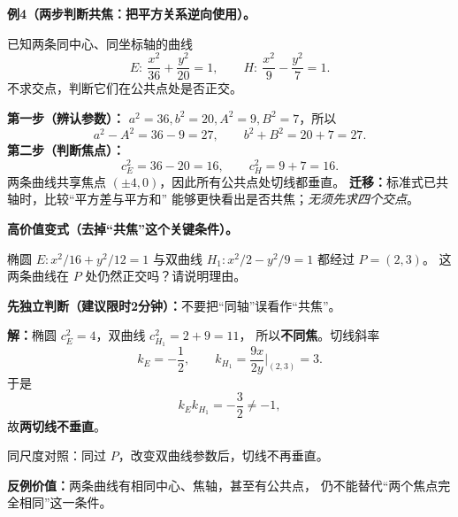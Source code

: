 \clearpage
\begin{examplebox}
\textbf{例4（两步判断共焦：把平方关系逆向使用）。}

已知两条同中心、同坐标轴的曲线
\[
 E:\ \frac{x^2}{36}+\frac{y^2}{20}=1,\qquad
 H:\ \frac{x^2}{9}-\frac{y^2}{7}=1.
\]
不求交点，判断它们在公共点处是否正交。

\textbf{第一步（辨认参数）：}
$a^2=36,b^2=20,A^2=9,B^2=7$，所以
\[
 a^2-A^2=36-9=27,\qquad b^2+B^2=20+7=27.
\]
\textbf{第二步（判断焦点）：}
\[
 c_E^2=36-20=16,\qquad c_H^2=9+7=16.
\]
两条曲线共享焦点 $(\pm4,0)$，因此所有公共点处切线都垂直。
\textbf{迁移：}标准式已共轴时，比较“平方差与平方和”
能够更快看出是否共焦；\emph{无须先求四个交点}。
\end{examplebox}

\clearpage
\begin{examplebox}
\textbf{高价值变式（去掉“共焦”这个关键条件）。}

椭圆 $E:x^2/16+y^2/12=1$ 与双曲线
$H_1:x^2/2-y^2/9=1$ 都经过 $P=(2,3)$。
这两条曲线在 $P$ 处仍然正交吗？请说明理由。

\textbf{先独立判断（建议限时2分钟）：}不要把“同轴”误看作“共焦”。

\textbf{解：}椭圆 $c_E^2=4$，双曲线 $c_{H_1}^2=2+9=11$，
所以\textbf{不同焦}。切线斜率
\[
k_E=-\frac12,\qquad
k_{H_1}=\frac{9x}{2y}\bigg|_{(2,3)}=3.
\]
于是
\[
\boxed{k_Ek_{H_1}=-\frac32\ne-1},
\]
故\textbf{两切线不垂直}。
\begin{center}


{\small 同尺度对照：同过 $P$，改变双曲线参数后，切线不再垂直。}
\end{center}
\textbf{反例价值：}两条曲线有相同中心、焦轴，甚至有公共点，
仍不能替代“两个焦点完全相同”这一条件。
\end{examplebox}
